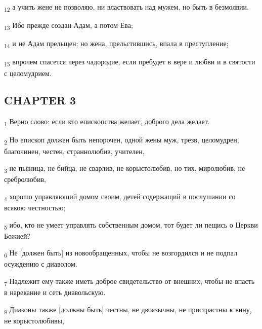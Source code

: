 \begin{tcolorbox}
\textsubscript{12} а учить жене не позволяю, ни властвовать над мужем, но быть в безмолвии.
\end{tcolorbox}
\begin{tcolorbox}
\textsubscript{13} Ибо прежде создан Адам, а потом Ева;
\end{tcolorbox}
\begin{tcolorbox}
\textsubscript{14} и не Адам прельщен; но жена, прельстившись, впала в преступление;
\end{tcolorbox}
\begin{tcolorbox}
\textsubscript{15} впрочем спасется через чадородие, если пребудет в вере и любви и в святости с целомудрием.
\end{tcolorbox}
\subsection{CHAPTER 3}
\begin{tcolorbox}
\textsubscript{1} Верно слово: если кто епископства желает, доброго дела желает.
\end{tcolorbox}
\begin{tcolorbox}
\textsubscript{2} Но епископ должен быть непорочен, одной жены муж, трезв, целомудрен, благочинен, честен, страннолюбив, учителен,
\end{tcolorbox}
\begin{tcolorbox}
\textsubscript{3} не пьяница, не бийца, не сварлив, не корыстолюбив, но тих, миролюбив, не сребролюбив,
\end{tcolorbox}
\begin{tcolorbox}
\textsubscript{4} хорошо управляющий домом своим, детей содержащий в послушании со всякою честностью;
\end{tcolorbox}
\begin{tcolorbox}
\textsubscript{5} ибо, кто не умеет управлять собственным домом, тот будет ли пещись о Церкви Божией?
\end{tcolorbox}
\begin{tcolorbox}
\textsubscript{6} Не [должен быть] из новообращенных, чтобы не возгордился и не подпал осуждению с диаволом.
\end{tcolorbox}
\begin{tcolorbox}
\textsubscript{7} Надлежит ему также иметь доброе свидетельство от внешних, чтобы не впасть в нарекание и сеть диавольскую.
\end{tcolorbox}
\begin{tcolorbox}
\textsubscript{8} Диаконы также [должны быть] честны, не двоязычны, не пристрастны к вину, не корыстолюбивы,
\end{tcolorbox}

